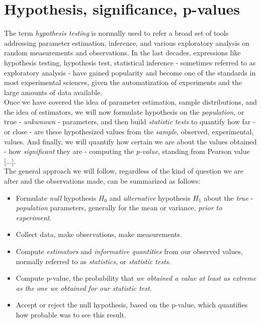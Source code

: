\documentclass{book}
\begin{document}
\section{Hypothesis, significance, p-values}

The term \textit{hypothesis testing} is normally used to refer a broad set of tools addressing parameter estimation, inference, and various exploratory analysis on random measurements and observations. In the last decades, expressions like hypothesis testing, hypothesis test, statistical inference - sometimes referred to as exploratory analysis - have gained popularity and become one of the standards in most experimental sciences, given the automatization of experiments and the large amounts of data available.\\

Once we have covered the idea of parameter estimation, sample distributions, and the idea of estimators, we will now formulate hypothesis on the \textit{population}, or true - \textit{unkwnown} - parameters, and then build \textit{statistic tests} to quantify how far - or close - are these hypothesized values from the \textit{sample}, observed, experimental, values. And finally, we will quantify how certain we are about the values obtained - how \textit{significant} they are - computing the \textit{p-value}, standing from Pearson value [...].\\ The general approach we will follow, regardless of the kind of question we are after and the observations made, can be summarized as follows:

\begin{itemize}
\item Formulate \textit{null} hypothesis $H_0$ and \textit{alternative} hypothesis $H_1$ about the \textit{true} - \textit{population} parameters, generally for the mean or variance, \textit{prior to experiment}.
\item Collect data, make observations, make measurements.
\item Compute \textit{estimators} and \textit{informative quantities} from our observed values, normally referred to as \textit{statistics}, or \textit{statistic tests}.
\item Compute p-value, the probability that \textit{we obtained a value at least as extreme as the one we obtained for our statistic test}.
\item Accept or reject the null hypothesis, based on the p-value, which quantifies how probable was to see this result.
\end{itemize}
\end{document}
